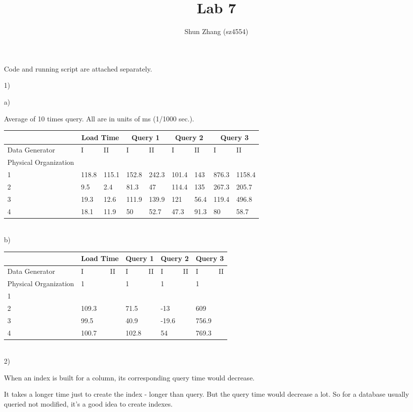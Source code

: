 \documentclass[12pt]{article}
\title{Lab 7}
\author{Shun Zhang (sz4554)}
\begin{document}
\maketitle

Code and running script are attached separately.

1)

a)

Average of 10 times query. All are in units of ms (1/1000 sec.).

\begin{tabular}{|l|l|l|l|l|l|l|l|l|}
	\hline
	&
	\multicolumn{2}{|c|}{Load Time} &
	\multicolumn{2}{|c|}{Query 1} &
	\multicolumn{2}{|c|}{Query 2} &
	\multicolumn{2}{|c|}{Query 3} \\ 
	\hline
	Data Generator & I & II & I & II & I & II & I & II \\ 
	\hline
	Physical Organization & \multicolumn{8}{|c|}{} \\
	\hline
	1& 118.8 & 115.1 & 152.8 & 242.3 & 101.4 & 143 & 876.3 & 1158.4 \\ 
	\hline
	2& 9.5 & 2.4 & 81.3 & 47 & 114.4 & 135 & 267.3 & 205.7 \\ 
	\hline
	3& 19.3 & 12.6 & 111.9 & 139.9 & 121 & 56.4 & 119.4 & 496.8 \\
	\hline
	4& 18.1 & 11.9 & 50 & 52.7 & 47.3 & 91.3 & 80 & 58.7 \\ 
	\hline
\end{tabular}
\\

b)

\begin{tabular}{|l|l|l|l|l|l|l|l|l|}
	\hline
	&
	\multicolumn{2}{|c|}{Load Time} &
	\multicolumn{2}{|c|}{Query 1} &
	\multicolumn{2}{|c|}{Query 2} &
	\multicolumn{2}{|c|}{Query 3} \\ 
	\hline
	Data Generator & I & II & I & II & I & II & I & II \\ 
	\hline
	Physical Organization & 1 &  & 1 &  & 1 &  & 1 &  \\
	\hline
	1& & & & & & & & \\ 
	\hline
	2& 109.3 & & 71.5 & & -13 & & 609 & \\ 
	\hline
	3& 99.5 & & 40.9 & & -19.6 & & 756.9 & \\
	\hline
	4& 100.7 & & 102.8 & & 54 & & 769.3 & \\
	\hline
\end{tabular}
\\

2)

When an index is built for a column, its corresponding query time would decrease.

It takes a longer time just to create the index - longer than query. But the query time would decrease a lot. So for a database usually queried not modified, it's a good idea to create indexes.
\end{document}
